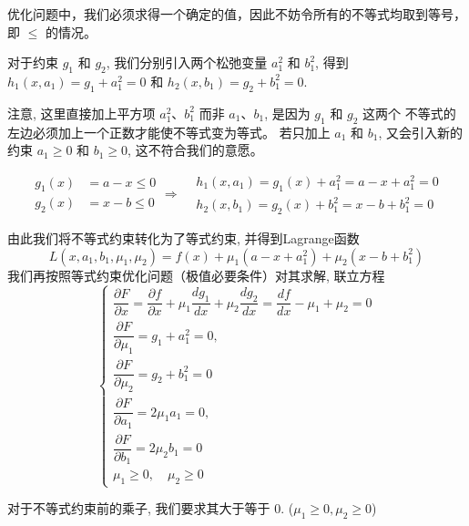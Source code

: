 \begin{remark}
    优化问题中，我们必须求得一个确定的值，因此不妨令所有的不等式均取到等号，即 $ \leq $ 的情况。
\end{remark}


对于约束 $ g_{1} $ 和 $ g_{2} $, 我们分别引入两个松弛变量 $ a_{1}^{2} $ 和 $ b_{1}^{2} $, 得到 $ h_{1}\left(x, a_{1}\right)=g_{1}+a_{1}^{2}=0 $ 和 $ h_{2}\left(x, b_{1}\right)=g_{2}+b_{1}^{2}=0 $. 

\begin{remark}
    注意, 这里直接加上平方项 $ a_{1}^{2} 、 b_{1}^{2} $ 而非 $ a_{1} 、 b_{1} $, 是因为 $ g_{1} $ 和 $ g_{2} $ 这两个 不等式的左边必须加上一个正数才能使不等式变为等式。 若只加上 $ a_{1} $ 和 $ b_{1} $, 又会引入新的约束 $ a_{1} \geq 0 $ 和 $ b_{1} \geq 0 $, 这不符合我们的意愿。
\end{remark}


$$\begin{aligned}
    g_1(x) &= a - x \le 0 \\
    g_2(x) &= x - b \le 0
\end{aligned} \Rightarrow \begin{aligned}
    &h_{1}\left(x, a_{1}\right)=g_{1}(x)+a_{1}^{2}=a-x+a_{1}^{2}=0\\
    &h_{2}\left(x, b_{1}\right)=g_{2}(x)+b_{1}^{2}=x-b+b_{1}^{2}=0
\end{aligned}$$


由此我们将不等式约束转化为了等式约束, 并得到Lagrange函数
$$
L\left(x, a_{1}, b_{1}, \mu_{1}, \mu_{2}\right)=f(x)+\mu_{1}\left(a-x+a_{1}^{2}\right)+\mu_{2}\left(x-b+b_{1}^{2}\right)
$$
我们再按照等式约束优化问题（极值必要条件）对其求解, 联立方程
$$
\left\{\begin{array}{l}
\dfrac{\partial F}{\partial x}=\dfrac{\partial f}{\partial x}+\mu_{1} \dfrac{d g_{1}}{d x}+\mu_{2} \dfrac{d g_{2}}{d x}=\dfrac{d f}{d x}-\mu_{1}+\mu_{2}=0 \\
\dfrac{\partial F}{\partial \mu_{1}}=g_{1}+a_{1}^{2}=0, \\ 
\dfrac{\partial F}{\partial \mu_{2}}=g_{2}+b_{1}^{2}=0 \\
\dfrac{\partial F}{\partial a_{1}}=2 \mu_{1} a_{1}=0, \\ 
\dfrac{\partial F}{\partial b_{1}}=2 \mu_{2} b_{1}=0 \\
\mu_{1} \geq 0, \quad \mu_{2} \geq 0
\end{array}\right.
$$

\begin{remark}
    对于不等式约束前的乘子, 我们要求其大于等于 0. ($\mu_{1} \geq 0, \mu_{2} \geq 0$)
\end{remark}

